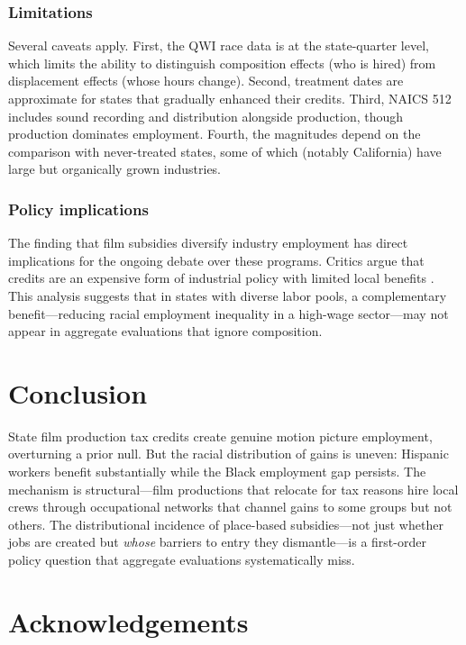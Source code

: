 \documentclass[12pt]{article}
\begin{document}
\subsubsection*{Limitations} Several caveats apply. First, the QWI race data is at the state-quarter level, which limits the ability to distinguish composition effects (who is hired) from displacement effects (whose hours change). Second, treatment dates are approximate for states that gradually enhanced their credits. Third, NAICS 512 includes sound recording and distribution alongside production, though production dominates employment. Fourth, the magnitudes depend on the comparison with never-treated states, some of which (notably California) have large but organically grown industries.

\subsubsection*{Policy implications} The finding that film subsidies diversify industry employment has direct implications for the ongoing debate over these programs. Critics argue that credits are an expensive form of industrial policy with limited local benefits \citep{Tannenwald2010}. This analysis suggests that in states with diverse labor pools, a complementary benefit---reducing racial employment inequality in a high-wage sector---may not appear in aggregate evaluations that ignore composition.

\section{Conclusion}

State film production tax credits create genuine motion picture employment, overturning a prior null. But the racial distribution of gains is uneven: Hispanic workers benefit substantially while the Black employment gap persists. The mechanism is structural---film productions that relocate for tax reasons hire local crews through occupational networks that channel gains to some groups but not others. The distributional incidence of place-based subsidies---not just whether jobs are created but \textit{whose} barriers to entry they dismantle---is a first-order policy question that aggregate evaluations systematically miss.

\section*{Acknowledgements}
\end{document}
